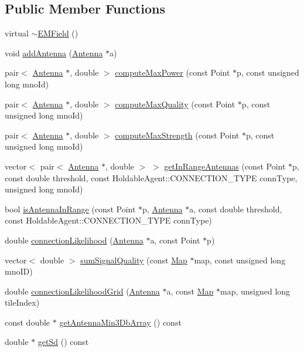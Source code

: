 \subsection*{Public Member Functions}
\begin{DoxyCompactItemize}
\item 
virtual \hyperlink{class_e_m_field_abe7db07a27a120858107d5efa5f14edb}{$\sim$\+E\+M\+Field} ()
\item 
void \hyperlink{class_e_m_field_ac531ecbce4c81aa5da19fe3c734a585c}{add\+Antenna} (\hyperlink{class_antenna}{Antenna} $\ast$a)
\item 
pair$<$ \hyperlink{class_antenna}{Antenna} $\ast$, double $>$ \hyperlink{class_e_m_field_a01cfb9fea3dadfcfe5d6f00551193acd}{compute\+Max\+Power} (const Point $\ast$p, const unsigned long mno\+Id)
\item 
pair$<$ \hyperlink{class_antenna}{Antenna} $\ast$, double $>$ \hyperlink{class_e_m_field_ac866f6224e34895a0ee085c4baf43a01}{compute\+Max\+Quality} (const Point $\ast$p, const unsigned long mno\+Id)
\item 
pair$<$ \hyperlink{class_antenna}{Antenna} $\ast$, double $>$ \hyperlink{class_e_m_field_a9a3cdbca4fcf408ce58a30fb98de1bbb}{compute\+Max\+Strength} (const Point $\ast$p, const unsigned long mno\+Id)
\item 
vector$<$ pair$<$ \hyperlink{class_antenna}{Antenna} $\ast$, double $>$ $>$ \hyperlink{class_e_m_field_a2ad800417b06a62e68edd1fccb5c4b93}{get\+In\+Range\+Antennas} (const Point $\ast$p, const double threshold, const Holdable\+Agent\+::\+C\+O\+N\+N\+E\+C\+T\+I\+O\+N\+\_\+\+T\+Y\+PE conn\+Type, unsigned long mno\+Id)
\item 
bool \hyperlink{class_e_m_field_a5cd43aded41779d2d24de3f3e5c717d0}{is\+Antenna\+In\+Range} (const Point $\ast$p, \hyperlink{class_antenna}{Antenna} $\ast$a, const double threshold, const Holdable\+Agent\+::\+C\+O\+N\+N\+E\+C\+T\+I\+O\+N\+\_\+\+T\+Y\+PE conn\+Type)
\item 
double \hyperlink{class_e_m_field_a710da64db53718cdeed7b8c8dc11bba3}{connection\+Likelihood} (\hyperlink{class_antenna}{Antenna} $\ast$a, const Point $\ast$p)
\item 
vector$<$ double $>$ \hyperlink{class_e_m_field_acef16c598b62605a691f75f99d364447}{sum\+Signal\+Quality} (const \hyperlink{class_map}{Map} $\ast$map, const unsigned long mno\+ID)
\item 
double \hyperlink{class_e_m_field_a6a4a10f9a013ab994eccb1ec10c0a180}{connection\+Likelihood\+Grid} (\hyperlink{class_antenna}{Antenna} $\ast$a, const \hyperlink{class_map}{Map} $\ast$map, unsigned long tile\+Index)
\item 
const double $\ast$ \hyperlink{class_e_m_field_ab2132484b9c52f2224bc81f354b24df6}{get\+Antenna\+Min3\+Db\+Array} () const
\item 
double $\ast$ \hyperlink{class_e_m_field_a0fea003948a67df01174480480376169}{get\+Sd} () const
\end{DoxyCompactItemize}
